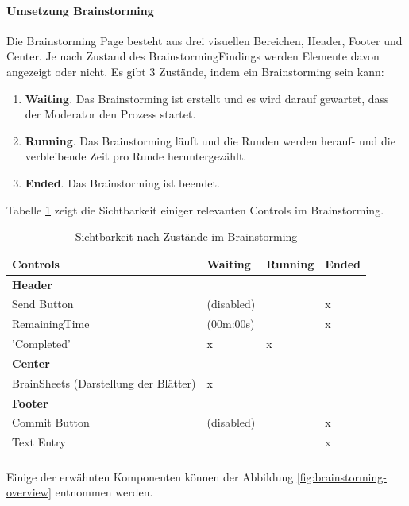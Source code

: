 \paragraph*{Umsetzung Brainstorming}
Die Brainstorming Page besteht aus drei visuellen Bereichen, Header, Footer und Center. Je nach Zustand des BrainstormingFindings werden Elemente davon angezeigt oder nicht. Es gibt 3 Zustände, indem ein Brainstorming sein kann:
\begin{enumerate}
	\item \textbf{Waiting}. Das Brainstorming ist erstellt und es wird darauf gewartet, dass der Moderator den Prozess startet.
	\item \textbf{Running}. Das Brainstorming läuft und die Runden werden herauf- und die verbleibende Zeit pro Runde heruntergezählt.
	\item \textbf{Ended}. Das Brainstorming ist beendet.
\end{enumerate}
Tabelle \ref{tab:visual-elements} zeigt die Sichtbarkeit einiger relevanten Controls im Brainstorming.

\renewcommand{\arraystretch}{1.5}
\begin{center}
	\begin{longtable}{| l | p{2cm} |p{2cm} |p{2cm} |}
		
		\hline
		Controls &Waiting & Running & Ended\\
		\hline
		\textbf{Header}	& & & \\
		Send Button & \checkmark (disabled) & \checkmark & x\\
		RemainingTime & \checkmark (00m:00s) & \checkmark & x\\
		'Completed' & x & x & \checkmark\\
		\hline
		\textbf{Center}	& & & \\
		BrainSheets (Darstellung der Blätter) & x & \checkmark & \checkmark\\
		\hline
		\textbf{Footer}	& & & \\
		Commit Button & \checkmark (disabled) & \checkmark & x\\
		Text Entry & \checkmark & \checkmark & x\\
		\hline
		\caption{Sichtbarkeit nach Zustände im Brainstorming}
		\label{tab:visual-elements}
	\end{longtable}
\end{center}
\vspace{-0.5cm}

Einige der erwähnten Komponenten können der Abbildung \ref{fig:brainstorming-overview} entnommen werden.


